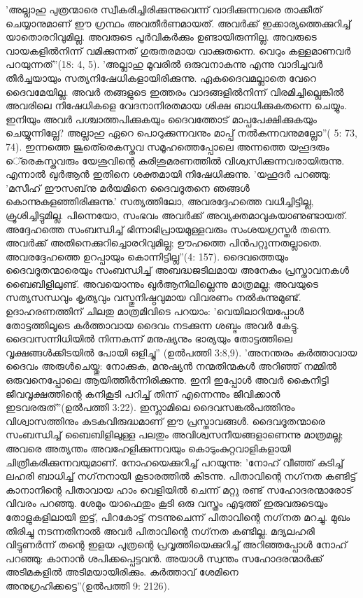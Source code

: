 'അല്ലാഹു പുത്രന്മാരെ സ്വീകരിച്ചിരിക്കുന്നുവെന്ന് വാദിക്കുന്നവരെ താക്കീത് ചെയ്യാനുമാണ് ഈ ഗ്രന്ഥം അവതീര്‍ണമായത്. അവര്‍ക്ക് ഇക്കാര്യത്തെക്കുറിച്ച് യാതൊരറിവുമില്ല. അവരുടെ പൂര്‍വികര്‍ക്കും ഉണ്ടായിരുന്നില്ല. അവരുടെ വായകളില്‍നിന്ന് വമിക്കുന്നത് ഗുരുതരമായ വാക്കുതന്നെ. വെറും കള്ളമാണവര്‍ പറയുന്നത്''(18: 4, 5).
'അല്ലാഹു മൂവരില്‍ ഒരുവനാകുന്നു എന്നു വാദിച്ചവര്‍ തീര്‍ച്ചയായും സത്യനിഷേധികളായിരിക്കുന്നു. ഏകദൈവമല്ലാതെ വേറെ ദൈവമേയില്ല. അവര്‍ തങ്ങളുടെ ഇത്തരം വാദങ്ങളില്‍നിന്ന് വിരമിച്ചില്ലെങ്കില്‍ അവരിലെ നിഷേധികളെ വേദനാനിരതമായ ശിക്ഷ ബാധിക്കുകതന്നെ ചെയ്യും. ഇനിയും അവര്‍ പശ്ചാത്തപിക്കുകയും ദൈവത്തോട് മാപ്പപേക്ഷിക്കുകയും ചെയ്യുന്നില്ലേ? അല്ലാഹു ഏറെ പൊറുക്കുന്നവനും മാപ്പ് നല്‍കുന്നവനുമല്ലോ''( 5: 73, 74).
ഇന്നത്തെ ജൂതെ്രെകസ്തവ സമൂഹത്തെപ്പോലെ അന്നത്തെ യഹൂദരും െ്രെകസ്തവരും യേശുവിന്റെ കുരിശുമരണത്തില്‍ വിശ്വസിക്കുന്നവരായിരുന്നു. എന്നാല്‍ ഖുര്‍ആന്‍ ഇതിനെ ശക്തമായി നിഷേധിക്കുന്നു. 'യഹൂദര്‍ പറഞ്ഞു: 'മസീഹ് ഈസബ്‌നു മര്‍യമിനെ ദൈവദൂതനെ ഞങ്ങള്‍ കൊന്നുകളഞ്ഞിരിക്കുന്നു.' സത്യത്തിലോ, അവരദ്ദേഹത്തെ വധിച്ചിട്ടില്ല, ക്രൂശിച്ചിട്ടുമില്ല. പിന്നെയോ, സംഭവം അവര്‍ക്ക് അവ്യക്തമാവുകയാണുണ്ടായത്. അദ്ദേഹത്തെ സംബന്ധിച്ച് ഭിന്നാഭിപ്രായമുള്ളവരും സംശയഗ്രസ്തര്‍ തന്നെ. അവര്‍ക്ക് അതിനെക്കുറിച്ചൊരറിവുമില്ല; ഊഹത്തെ പിന്‍പറ്റുന്നതല്ലാതെ. അവരദ്ദേഹത്തെ ഉറപ്പായും കൊന്നിട്ടില്ല''(4: 157).
ദൈവത്തെയും ദൈവദൂതന്മാരെയും സംബന്ധിച്ച് അബദ്ധജടിലമായ അനേകം പ്രസ്താവനകള്‍ ബൈബിളിലുണ്ട്. അവയൊന്നും ഖുര്‍ആനിലില്ലെന്നു മാത്രമല്ല; അവയുടെ സത്യസന്ധവും കൃത്യവും വസ്തുനിഷ്ഠവുമായ വിവരണം നല്‍കുന്നുമുണ്ട്. ഉദാഹരണത്തിന് ചിലതു മാത്രമിവിടെ പറയാം:
'വെയിലാറിയപ്പോള്‍ തോട്ടത്തിലൂടെ കര്‍ത്താവായ ദൈവം നടക്കുന്ന ശബ്ദം അവര്‍ കേട്ടു. ദൈവസന്നിധിയില്‍ നിന്നകന്ന് മനുഷ്യനും ഭാര്യയും തോട്ടത്തിലെ വൃക്ഷങ്ങള്‍ക്കിടയില്‍ പോയി ഒളിച്ചു'' (ഉല്‍പത്തി 3:8,9).
'അനന്തരം കര്‍ത്താവായ ദൈവം അരുള്‍ചെയ്തു: നോക്കുക, മനുഷ്യന്‍ നന്മതിന്മകള്‍ അറിഞ്ഞ് നമ്മില്‍ ഒരുവനെപ്പോലെ ആയിത്തീര്‍ന്നിരിക്കുന്നു. ഇനി ഇപ്പോള്‍ അവര്‍ കൈനീട്ടി ജീവവൃക്ഷത്തിന്റെ കനികൂടി പറിച്ച് തിന്ന് എന്നെന്നും ജീവിക്കാന്‍ ഇടവരരുത്''(ഉല്‍പത്തി 3:22).
ഇസ്ലാമിലെ ദൈവസങ്കല്‍പത്തിനും വിശ്വാസത്തിനും കടകവിരുദ്ധമാണ് ഈ പ്രസ്താവങ്ങള്‍. ദൈവദൂതന്മാരെ സംബന്ധിച്ച് ബൈബിളിലുള്ള പലതും അവിശ്വസനീയങ്ങളാണെന്നു മാത്രമല്ല; അവരെ അത്യന്തം അവഹേളിക്കുന്നവയും കൊടുംകുറ്റവാളികളായി ചിത്രീകരിക്കുന്നവയുമാണ്. നോഹയെക്കുറിച്ച് പറയുന്നു: 'നോഹ് വീഞ്ഞ് കുടിച്ച് ലഹരി ബാധിച്ച് നഗ്‌നനായി കൂടാരത്തില്‍ കിടന്നു. പിതാവിന്റെ നഗ്‌നത കണ്ടിട്ട് കാനാനിന്റെ പിതാവായ ഹാം വെളിയില്‍ ചെന്ന് മറ്റു രണ്ട് സഹോദരന്മാരോട് വിവരം പറഞ്ഞു. ശേമും യാഫെതും കൂടി ഒരു വസ്ത്രം എടുത്ത് ഇരുവരുടെയും തോളുകളിലായി ഇട്ട്, പിറകോട്ട് നടന്നുചെന്ന് പിതാവിന്റെ നഗ്‌നത മറച്ചു. മുഖം തിരിച്ചു നടന്നതിനാല്‍ അവര്‍ പിതാവിന്റെ നഗ്‌നത കണ്ടില്ല. മദ്യലഹരി വിട്ടുണര്‍ന്ന് തന്റെ ഇളയ പുത്രന്റെ പ്രവൃത്തിയെക്കുറിച്ച് അറിഞ്ഞപ്പോള്‍ നോഹ് പറഞ്ഞു: കാനാന്‍ ശപിക്കപ്പെട്ടവന്‍. അയാള്‍ സ്വന്തം സഹോദരന്മാര്‍ക്ക് അടിമകളില്‍ അടിമയായിരിക്കും. കര്‍ത്താവ് ശേമിനെ അനുഗ്രഹിക്കട്ടെ''(ഉല്‍പത്തി 9: 2126).
